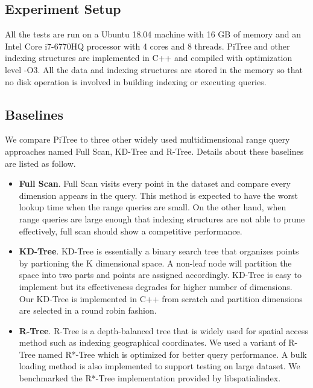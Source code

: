 \documentclass[sigconf,10pt]{acmart}
\begin{document}
\subsection{Experiment Setup}

All the tests are run on a Ubuntu 18.04 machine with 16 GB of memory and an Intel 
Core i7-6770HQ processor with 4 cores and 8 threads. PiTree and other indexing 
structures are implemented in C++ and compiled with optimization level -O3. 
All the data and indexing structures are stored in the memory so that no disk 
operation is involved in building indexing or executing queries.

\subsection{Baselines}

We compare PiTree to three other widely used multidimensional range query approaches 
named Full Scan, KD-Tree and R-Tree. Details about these baselines are listed 
as follow. 
\begin{itemize}
    \item \textbf{Full Scan}. Full Scan visits every point in the dataset and 
    compare every dimension appears in the query. This method is expected to have 
    the worst lookup time when the range queries are small. On the other hand, 
    when range queries are large enough that indexing structures are not able to 
    prune effectively, full scan should show a competitive performance.
    \item \textbf{KD-Tree}. KD-Tree is essentially a binary search tree that organizes
    points by partioning the K dimensional space. A non-leaf node will partition 
    the space into two parts and points are assigned accordingly. KD-Tree is easy to 
    implement but its effectiveness degrades for higher number of dimensions. Our KD-Tree is
    implemented in C++ from scratch and partition dimensions are selected in a round robin fashion.
    \item \textbf{R-Tree}. R-Tree is a depth-balanced tree that is widely used for spatial
    access method such as indexing geographical coordinates. We used a variant of R-Tree named
    R*-Tree which is optimized for better query performance. A bulk loading method is also 
    implemented to support testing on large dataset. We benchmarked the R*-Tree implementation
    provided by libspatialindex.\cite{libSpatialIndex}

\end{itemize}
\end{document}
